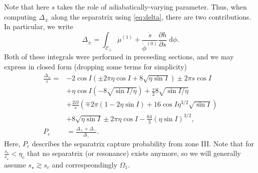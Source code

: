 \documentclass[
        fleqn,
        usenatbib,
    ]{mnras}
\newcommand*{\pd}[2]{\frac{\partial#1}{\partial#2}}
\newcommand*{\p}[1]{\left(#1\right)}
\begin{document}
Note that here $s$ takes the role of adiabatically-varying parameter. Thus, when
computing $\Delta_{\pm}$ along the separatrix using \autoref{eq:delta}, there
are two contributions. In particular, we write
\begin{equation}
    \Delta_{\pm} = \int_{\mathcal{C}_{\pm}} \dot{\mu}^{(1)} +
        \frac{\dot{s}}{\dot{\phi}^{(0)}} \pd{h}{s}
        \;\mathrm{d}\phi.
\end{equation}
Both of these integrals were performed in preceeding sections, and we may
express in closed form (dropping some terms for simplicity)
\begin{align}
    \frac{\Delta_{\pm}}{\epsilon} ={}&
        -2\cos I\p{\pm 2\pi \eta \cos I + 8\sqrt{\eta \sin I}}
        \pm 2\pi s\cos I\nonumber\\
        &+ \eta \cos I \p{-8\sqrt{\sin I / \eta}}
            + \frac{s}{2}8\sqrt{\sin I/\eta}\nonumber\\
        &+ \frac{2\Omega}{s}\p{\mp 2\pi\p{1 - 2\eta \sin I}
            + 16\cos I \eta^{3/2}\sqrt{\sin I}}\nonumber\\
        &+ 8\sqrt{\eta \sin I}
            \pm 2 \pi \eta \cos I
            - \frac{64}{3} \p{\eta \sin I}^{3/2},\label{eq:delta_p4}\\
    P_{c} &= \frac{\Delta_+ + \Delta_-}{\Delta_-}. \label{eq:p_c_p4}
\end{align}
Here, $P_c$ describes the separatrix capture probability from zone III\@. Note
that for $\frac{s_c}{s_\star} < \eta_c$ that no separatrix (or resonance) exists
anymore, so we will generally assume $s_\star \gtrsim s_c$ and correspeondingly
$\Omega_1$.
\end{document}

